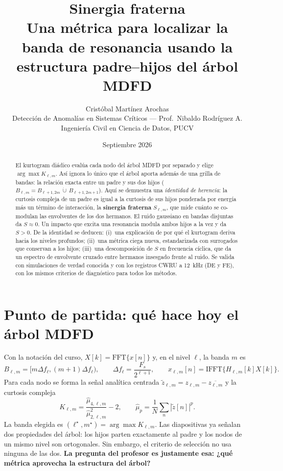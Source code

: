 \documentclass[11pt,a4paper]{article}
\title{\textbf{Sinergia fraterna}\\[2pt]
\large Una métrica para localizar la banda de resonancia usando la estructura padre--hijos del árbol MDFD}
\author{Cristóbal Martínez Arochas\\
\small Detección de Anomalías en Sistemas Críticos --- Prof.\ Nibaldo Rodríguez A.\\
\small Ingeniería Civil en Ciencia de Datos, PUCV}
\date{Septiembre 2026}
\theoremstyle{definition}
\theoremstyle{remark}
\begin{document}
\maketitle

\begin{abstract}
El kurtogram diádico evalúa cada nodo del árbol MDFD por separado y elige $\arg\max K_{\ell,m}$. Así ignora lo único que el árbol aporta además de una grilla de bandas: la relación exacta entre un padre y sus dos hijos ($B_{\ell,m}=B_{\ell+1,2m}\,\dot\cup\,B_{\ell+1,2m+1}$). Aquí se demuestra una \emph{identidad de herencia}: la curtosis compleja de un padre es igual a la curtosis de sus hijos ponderada por energía más un término de interacción, la \textbf{sinergia fraterna} $S_{\ell,m}$, que mide cuánto se co-modulan las envolventes de los dos hermanos.
El ruido gaussiano en bandas disjuntas da $S\approx 0$. Un impacto que excita una resonancia modula ambos hijos a la vez y da $S>0$. De la identidad se deducen:
(i)~una explicación de por qué el kurtogram deriva hacia los niveles profundos;
(ii)~una métrica ciega nueva, estandarizada con surrogados que conservan a los hijos;
(iii)~una descomposición de $S$ en frecuencia cíclica, que da un espectro de envolvente cruzado entre hermanos insesgado frente al ruido.
Se valida con simulaciones de verdad conocida y con los registros CWRU a 12~kHz (DE y FE), con los mismos criterios de diagnóstico para todos los métodos.
\end{abstract}

\tableofcontents
\newpage

\section{Punto de partida: qué hace hoy el árbol MDFD}
Con la notación del curso, $X[k]=\mathrm{FFT}\{x[n]\}$ y, en el nivel $\ell$, la banda $m$ es
\[
B_{\ell,m}=[m\Delta f_\ell,(m+1)\Delta f_\ell),\qquad \Delta f_\ell=\frac{F_s}{2^{\ell+1}},\qquad x_{\ell,m}[n]=\mathrm{IFFT}\{H_{\ell,m}[k]X[k]\}.
\]
Para cada nodo se forma la señal analítica centrada $\tilde z_{\ell,m}=z_{\ell,m}-\overline{z_{\ell,m}}$ y la curtosis compleja
\[
K_{\ell,m}=\frac{\hat\mu_{4,\ell,m}}{\hat\mu_{2,\ell,m}^2}-2,\qquad \hat\mu_{p}=\frac1N\sum_n|\tilde z[n]|^p .
\]
La banda elegida es $(\ell^\star,m^\star)=\arg\max K_{\ell,m}$. Las diapositivas ya señalan dos propiedades del árbol: los hijos parten exactamente al padre y los nodos de un mismo nivel son ortogonales. Sin embargo, el criterio de selección no usa ninguna de las dos. \textbf{La pregunta del profesor es justamente esa: ¿qué métrica aprovecha la estructura del árbol?}
\end{document}

